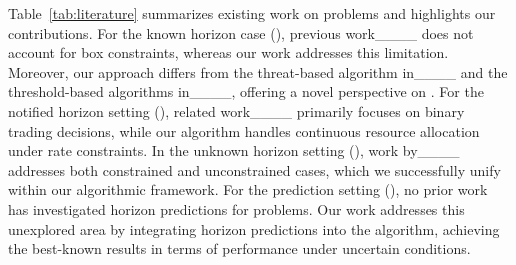 Table~\ref{tab:literature} summarizes existing work on \OC problems and highlights our contributions. For the known horizon case (\OCK), previous work____ does not account for box constraints, whereas our work addresses this limitation. Moreover, our approach differs from the threat-based algorithm in____ and the threshold-based algorithms in____, offering a novel perspective on \OCK. For the notified horizon setting (\OCN), related work____ primarily focuses on binary trading decisions, while our algorithm handles continuous resource allocation under rate constraints. In the unknown horizon setting (\OCU), work by____ addresses both constrained and unconstrained cases, which we successfully unify within our algorithmic framework. For the prediction setting (\OCP), no prior work has investigated horizon predictions for \OC problems. Our work addresses this unexplored area by integrating horizon predictions into the algorithm, achieving the best-known results in terms of performance under uncertain conditions.
